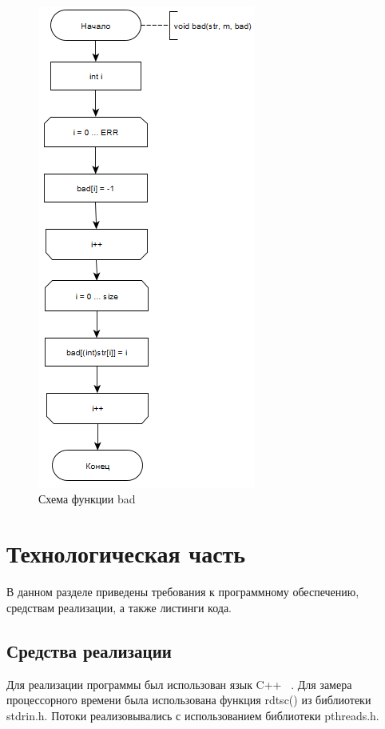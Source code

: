 \documentclass[12pt, a4paper]{report}
\begin{document}
	\begin{figure}[ht!]
		\centering
		\includegraphics[scale=1.2]{img/bm.png}
		\caption{Схема функции bad}
		\label{ris:bad}
	\end{figure}\newpage

	\newpage
	
	\chapter{Технологическая часть}
	В данном разделе приведены требования к программному обеспечению, средствам реализации, а также листинги кода.
	\section{Средства реализации}
	Для реализации программы был использован язык C++ ~\cite{CPP}. Для замера процессорного времени была использована функция rdtsc() из библиотеки stdrin.h. Потоки реализовывались с использованием библиотеки pthreads.h.
\end{document}
